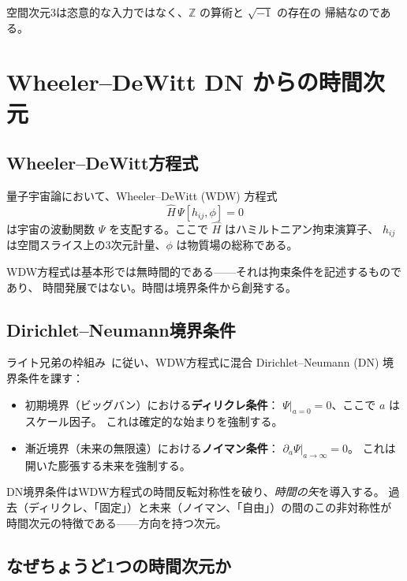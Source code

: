 \documentclass[12pt,a4paper]{article}
\theoremstyle{definition}
\newcommand{\ZZ}{\mathbb{Z}}
\begin{document}
空間次元3は恣意的な入力ではなく、$\ZZ$ の算術と $\sqrt{-1}$ の存在の
帰結なのである。

\section{Wheeler--DeWitt DN からの時間次元}\label{sec:WDW}

\subsection{Wheeler--DeWitt方程式}

量子宇宙論において、Wheeler--DeWitt (WDW) 方程式~\cite{DeWitt1967,Wheeler1968}
\[
  \hat{H}\,\Psi[h_{ij}, \phi] = 0
\]
は宇宙の波動関数 $\Psi$ を支配する。ここで $\hat{H}$ はハミルトニアン拘束演算子、
$h_{ij}$ は空間スライス上の3次元計量、$\phi$ は物質場の総称である。

WDW方程式は基本形では無時間的である——それは拘束条件を記述するものであり、
時間発展ではない。時間は境界条件から創発する。

\subsection{Dirichlet--Neumann境界条件}

ライト兄弟の枠組み~\cite{WB-WDW}に従い、WDW方程式に混合
Dirichlet--Neumann (DN) 境界条件を課す：

\begin{itemize}
  \item 初期境界（ビッグバン）における\textbf{ディリクレ条件}：
    $\Psi|_{a=0} = 0$、ここで $a$ はスケール因子。
    これは確定的な始まりを強制する。
  \item 漸近境界（未来の無限遠）における\textbf{ノイマン条件}：
    $\partial_a \Psi|_{a \to \infty} = 0$。
    これは開いた膨張する未来を強制する。
\end{itemize}

DN境界条件はWDW方程式の時間反転対称性を破り、\emph{時間の矢}を導入する。
過去（ディリクレ、「固定」）と未来（ノイマン、「自由」）の間のこの非対称性が
時間次元の特徴である——方向を持つ次元。

\subsection{なぜちょうど1つの時間次元か}
\end{document}

